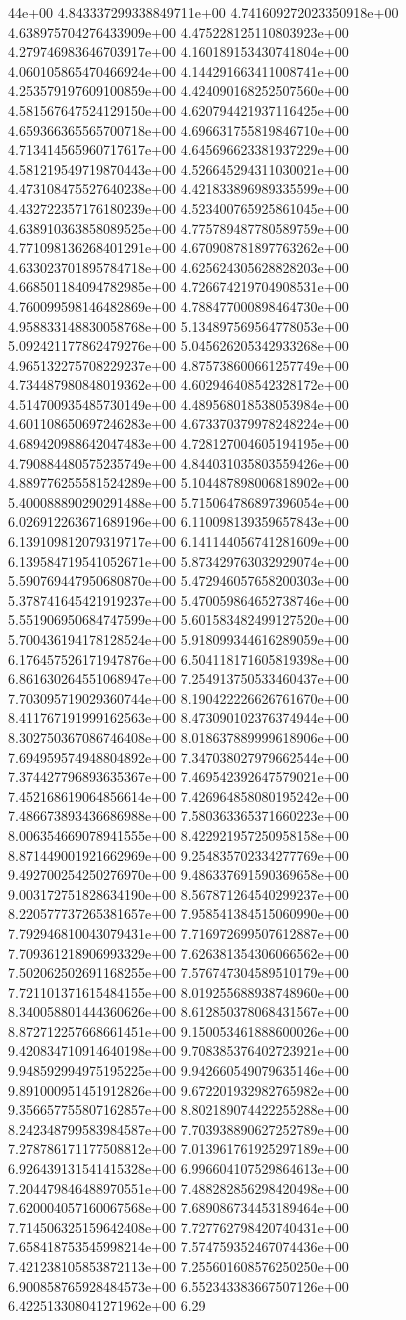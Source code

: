 44e+00	4.843337299338849711e+00	4.741609272023350918e+00	4.638975704276433909e+00	4.475228125110803923e+00	4.279746983646703917e+00	4.160189153430741804e+00	4.060105865470466924e+00	4.144291663411008741e+00	4.253579197609100859e+00	4.424090168252507560e+00	4.581567647524129150e+00	4.620794421937116425e+00	4.659366365565700718e+00	4.696631755819846710e+00	4.713414565960717617e+00	4.645696623381937229e+00	4.581219549719870443e+00	4.526645294311030021e+00	4.473108475527640238e+00	4.421833896989335599e+00	4.432722357176180239e+00	4.523400765925861045e+00	4.638910363858089525e+00	4.775789487780589759e+00	4.771098136268401291e+00	4.670908781897763262e+00	4.633023701895784718e+00	4.625624305628828203e+00	4.668501184094782985e+00	4.726674219704908531e+00	4.760099598146482869e+00	4.788477000898464730e+00	4.958833148830058768e+00	5.134897569564778053e+00	5.092421177862479276e+00	5.045626205342933268e+00	4.965132275708229237e+00	4.875738600661257749e+00	4.734487980848019362e+00	4.602946408542328172e+00	4.514700935485730149e+00	4.489568018538053984e+00	4.601108650697246283e+00	4.673370379978248224e+00	4.689420988642047483e+00	4.728127004605194195e+00	4.790884480575235749e+00	4.844031035803559426e+00	4.889776255581524289e+00	5.104487898006818902e+00	5.400088890290291488e+00	5.715064786897396054e+00	6.026912263671689196e+00	6.110098139359657843e+00	6.139109812079319717e+00	6.141144056741281609e+00	6.139584719541052671e+00	5.873429763032929074e+00	5.590769447950680870e+00	5.472946057658200303e+00	5.378741645421919237e+00	5.470059864652738746e+00	5.551906950684747599e+00	5.601583482499127520e+00	5.700436194178128524e+00	5.918099344616289059e+00	6.176457526171947876e+00	6.504118171605819398e+00	6.861630264551068947e+00	7.254913750533460437e+00	7.703095719029360744e+00	8.190422226626761670e+00	8.411767191999162563e+00	8.473090102376374944e+00	8.302750367086746408e+00	8.018637889999618906e+00	7.694959574948804892e+00	7.347038027979662544e+00	7.374427796893635367e+00	7.469542392647579021e+00	7.452168619064856614e+00	7.426964858080195242e+00	7.486673893436686988e+00	7.580363365371660223e+00	8.006354669078941555e+00	8.422921957250958158e+00	8.871449001921662969e+00	9.254835702334277769e+00	9.492700254250276970e+00	9.486337691590369658e+00	9.003172751828634190e+00	8.567871264540299237e+00	8.220577737265381657e+00	7.958541384515060990e+00	7.792946810043079431e+00	7.716972699507612887e+00	7.709361218906993329e+00	7.626381354306066562e+00	7.502062502691168255e+00	7.576747304589510179e+00	7.721101371615484155e+00	8.019255688938748960e+00	8.340058801444360626e+00	8.612850378068431567e+00	8.872712257668661451e+00	9.150053461888600026e+00	9.420834710914640198e+00	9.708385376402723921e+00	9.948592994975195225e+00	9.942660549079635146e+00	9.891000951451912826e+00	9.672201932982765982e+00	9.356657755807162857e+00	8.802189074422255288e+00	8.242348799583984587e+00	7.703938890627252789e+00	7.278786171177508812e+00	7.013961761925297189e+00	6.926439131541415328e+00	6.996604107529864613e+00	7.204479846488970551e+00	7.488282856298420498e+00	7.620004057160067568e+00	7.689086734453189464e+00	7.714506325159642408e+00	7.727762798420740431e+00	7.658418753545998214e+00	7.574759352467074436e+00	7.421238105853872113e+00	7.255601608576250250e+00	6.900858765928484573e+00	6.552343383667507126e+00	6.422513308041271962e+00	6.29